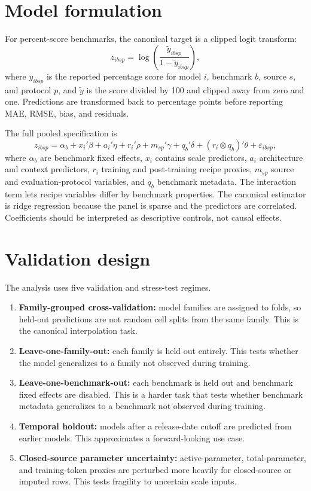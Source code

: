 \documentclass[11pt]{article}
\begin{document}
\section{Model formulation}
For percent-score benchmarks, the canonical target is a clipped logit transform:
\[
  z_{i b s p}=\log\left(\frac{\tilde y_{i b s p}}{1-\tilde y_{i b s p}}\right),
\]
where $y_{i b s p}$ is the reported percentage score for model $i$, benchmark $b$, source $s$, and protocol $p$, and $\tilde y$ is the score divided by 100 and clipped away from zero and one. Predictions are transformed back to percentage points before reporting MAE, RMSE, bias, and residuals.

The full pooled specification is
\[
 z_{i b s p}=\alpha_b + x_i'\beta + a_i'\eta + r_i'\rho + m_{s p}'\gamma + q_b'\delta
 + (r_i \otimes q_b)'\theta + \varepsilon_{i b s p},
\]
where $\alpha_b$ are benchmark fixed effects, $x_i$ contains scale predictors, $a_i$ architecture and context predictors, $r_i$ training and post-training recipe proxies, $m_{sp}$ source and evaluation-protocol variables, and $q_b$ benchmark metadata. The interaction term lets recipe variables differ by benchmark properties. The canonical estimator is ridge regression because the panel is sparse and the predictors are correlated. Coefficients should be interpreted as descriptive controls, not causal effects.

\section{Validation design}
The analysis uses five validation and stress-test regimes.
\begin{enumerate}[leftmargin=*]
\item \textbf{Family-grouped cross-validation:} model families are assigned to folds, so held-out predictions are not random cell splits from the same family. This is the canonical interpolation task.
\item \textbf{Leave-one-family-out:} each family is held out entirely. This tests whether the model generalizes to a family not observed during training.
\item \textbf{Leave-one-benchmark-out:} each benchmark is held out and benchmark fixed effects are disabled. This is a harder task that tests whether benchmark metadata generalizes to a benchmark not observed during training.
\item \textbf{Temporal holdout:} models after a release-date cutoff are predicted from earlier models. This approximates a forward-looking use case.
\item \textbf{Closed-source parameter uncertainty:} active-parameter, total-parameter, and training-token proxies are perturbed more heavily for closed-source or imputed rows. This tests fragility to uncertain scale inputs.
\end{enumerate}
\end{document}
